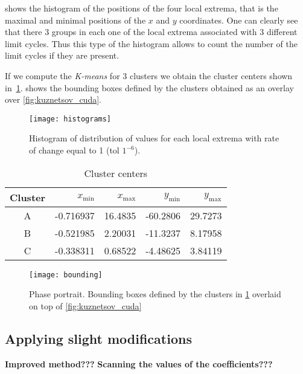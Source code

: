  shows the histogram of the positions of the four local extrema, that is the maximal and minimal positions of the $x$ and $y$ coordinates. 
One can clearly see that there 3 groups in each one of the local extrema associated with 3 different limit cycles.
Thus this type of the histogram allows to count the number of the limit cycles if they are present.

If we compute the \emph{K-means} for 3 clusters we obtain the cluster centers shown in~\cref{tab:clusters}.  shows the bounding boxes defined by the clusters obtained as an overlay over \cref{fig:kuznetsov_cuda}.

\begin{figure}[H]
    \centering
    \texttt{[image: histograms]}
    \caption[Distribution values for local extrema]%
    {Histogram of distribution of values for each local extrema with rate of
        change equal to 1 (tol $1^{-6}$).
    }%
    \label{fig:histograms}
\end{figure}

\begin{table}[H]
    \centering
    \caption{Cluster centers}%
    \label{tab:clusters}
    \begin{tabular}{crrrr}
        \toprule
        Cluster & $x_{\min}$ & $x_{\max}$ & $y_{\min}$ & $y_{\max}$ \\ \midrule
        A & -0.716937 & 16.4835  & -60.2806  & 29.7273 \\
        B & -0.521985 &  2.20031 & -11.3237  &  8.17958 \\
        C & -0.338311 &  0.68522 &  -4.48625 &  3.84119 \\
        \bottomrule
    \end{tabular}
\end{table}

\begin{figure}[H]
    \centering
    \texttt{[image: bounding]}
    \caption{Phase portrait. Bounding boxes defined by the clusters in \cref{tab:clusters} overlaid on top of \cref{fig:kuznetsov_cuda}
    }%
    \label{fig:bounding}
\end{figure}

\pagebreak
\subsection{Applying slight modifications}
{\bf Improved method???}
{\bf Scanning the values of the coefficients???}

